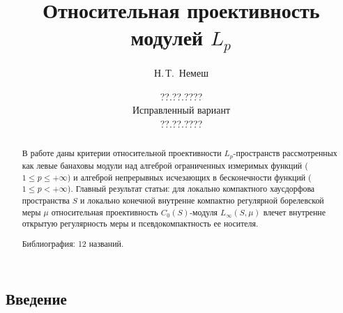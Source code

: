 \documentclass[12pt]{article}
\numberwithin{equation}{subsection}
\theoremstyle{plain}
\begin{document}

\date{??.??.????\\
    Исправленный вариант\\ ??.??.????}

\author{Н.\,Т.~Немеш}
\address{Московский государственный университет \\им. М. В. Ломоносова}

\title{Относительная проективность модулей $L_p$}

\maketitle

\begin{fulltext}
    \begin{abstract}

        В работе даны критерии относительной проективности $L_p$-про\-странств рассмотренных как левые банаховы модули над алгеброй ограниченных измеримых функций ($1\leq p\leq+\infty$) и алгеброй непрерывных исчезающих в бесконечности функций ($1\leq p <+\infty$). Главный результат статьи: для локально компактного хаусдорфова пространства $S$ и локально конечной внутренне компактно регулярной борелевской меры $\mu$ относительная проективность $C_0(S)$-модуля $L_\infty(S,\mu)$ влечет внутренне открытую регулярность меры и псевдокомпактность ее носителя.

        Библиография: 12 названий.
    \end{abstract}




    \section{Введение}
    \label{SectionIntroduction}


\end{fulltext}
\end{document}
